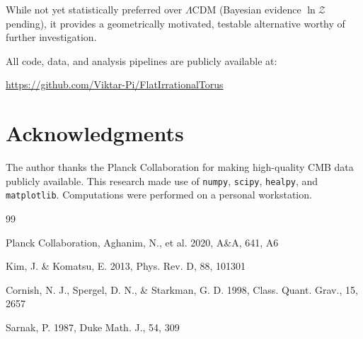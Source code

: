\documentclass[a4paper,11pt]{article}
\begin{document}
While not yet statistically preferred over $\Lambda$CDM (Bayesian evidence $\ln\mathcal{Z}$ pending), it provides a geometrically motivated, testable alternative worthy of further investigation.

All code, data, and analysis pipelines are publicly available at:
\begin{center}
\url{https://github.com/Viktar-Pi/FlatIrrationalTorus}
\end{center}

\section*{Acknowledgments}

The author thanks the Planck Collaboration for making high-quality CMB data publicly available. This research made use of \texttt{numpy}, \texttt{scipy}, \texttt{healpy}, and \texttt{matplotlib}. Computations were performed on a personal workstation.

\begin{thebibliography}{99}

Planck Collaboration, Aghanim, N., et al. 2020, A\&A, 641, A6

Kim, J. \& Komatsu, E. 2013, Phys. Rev. D, 88, 101301

Cornish, N. J., Spergel, D. N., \& Starkman, G. D. 1998, Class. Quant. Grav., 15, 2657

Sarnak, P. 1987, Duke Math. J., 54, 309

\end{thebibliography}
\end{document}
